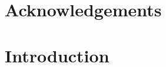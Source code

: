 \documentclass[a4paper, oneside]{book}
\newenvironment{abstract}{\thispagestyle{plain}\null\vfill\begin{center}\bfseries\abstractname\end{center}}{\vfill\null}
\begin{document}
\pdfbookmark{\abstractname}{\abstractname}

\begin{abstract}
  
\end{abstract}

\glsresetall

\begin{otherlanguage}{ngerman}
  \pdfbookmark{\abstractname}{\abstractname}
  \begin{abstract}
    
  \end{abstract}
\end{otherlanguage}

\glsresetall


\cleardoublepage


\chapter*{Acknowledgements}




\cleardoublepage

\pdfbookmark{\contentsname}{\contentsname}


\tableofcontents


\mainmatter


\chapter{Introduction}

\label{chapter:introduction}






\end{document}

